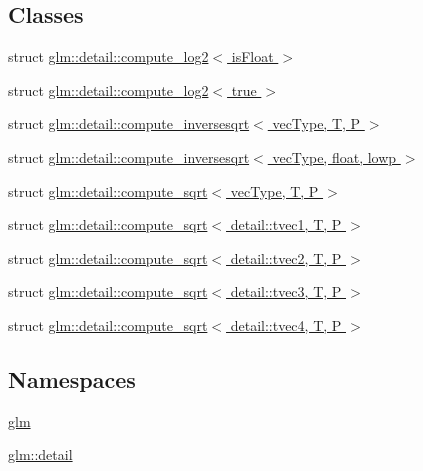 \subsection*{Classes}
\begin{DoxyCompactItemize}
\item 
struct \hyperlink{structglm_1_1detail_1_1compute__log2}{glm\+::detail\+::compute\+\_\+log2$<$ is\+Float $>$}
\item 
struct \hyperlink{structglm_1_1detail_1_1compute__log2_3_01true_01_4}{glm\+::detail\+::compute\+\_\+log2$<$ true $>$}
\item 
struct \hyperlink{structglm_1_1detail_1_1compute__inversesqrt}{glm\+::detail\+::compute\+\_\+inversesqrt$<$ vec\+Type, T, P $>$}
\item 
struct \hyperlink{structglm_1_1detail_1_1compute__inversesqrt_3_01vec_type_00_01float_00_01lowp_01_4}{glm\+::detail\+::compute\+\_\+inversesqrt$<$ vec\+Type, float, lowp $>$}
\item 
struct \hyperlink{structglm_1_1detail_1_1compute__sqrt}{glm\+::detail\+::compute\+\_\+sqrt$<$ vec\+Type, T, P $>$}
\item 
struct \hyperlink{structglm_1_1detail_1_1compute__sqrt_3_01detail_1_1tvec1_00_01_t_00_01_p_01_4}{glm\+::detail\+::compute\+\_\+sqrt$<$ detail\+::tvec1, T, P $>$}
\item 
struct \hyperlink{structglm_1_1detail_1_1compute__sqrt_3_01detail_1_1tvec2_00_01_t_00_01_p_01_4}{glm\+::detail\+::compute\+\_\+sqrt$<$ detail\+::tvec2, T, P $>$}
\item 
struct \hyperlink{structglm_1_1detail_1_1compute__sqrt_3_01detail_1_1tvec3_00_01_t_00_01_p_01_4}{glm\+::detail\+::compute\+\_\+sqrt$<$ detail\+::tvec3, T, P $>$}
\item 
struct \hyperlink{structglm_1_1detail_1_1compute__sqrt_3_01detail_1_1tvec4_00_01_t_00_01_p_01_4}{glm\+::detail\+::compute\+\_\+sqrt$<$ detail\+::tvec4, T, P $>$}
\end{DoxyCompactItemize}
\subsection*{Namespaces}
\begin{DoxyCompactItemize}
\item 
 \hyperlink{namespaceglm}{glm}
\item 
 \hyperlink{namespaceglm_1_1detail}{glm\+::detail}
\end{DoxyCompactItemize}
